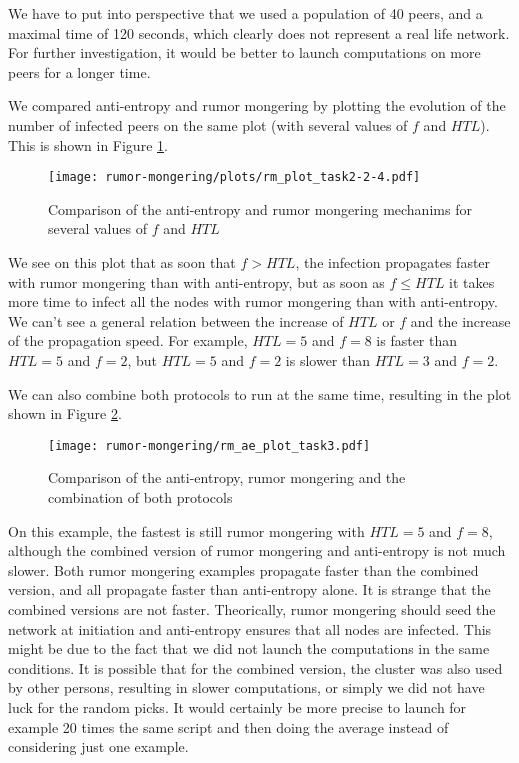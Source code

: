 \documentclass[a4paper, 11pt]{article}
\theoremstyle{plain}
\theoremstyle{definition}
\begin{document}
  We have to put into perspective that we used a population of 40 peers, and a maximal time of 120 seconds, which clearly does not represent a
  real life network. For further investigation, it would be better to launch computations on more peers for a
  longer time.

  We compared anti-entropy and rumor mongering by plotting the evolution of the number of infected peers on
  the same plot (with several values of $f$ and $HTL$). This is shown in Figure \ref{fig:task2-2-4}. 

  
  \begin{figure}[h]
    \centering
    \texttt{[image: rumor-mongering/plots/rm\_plot\_task2-2-4.pdf]}
    \caption{Comparison of the anti-entropy and rumor mongering mechanims for several values of $f$ and $HTL$}
    \label{fig:task2-2-4}
  \end{figure}

  We see on this plot that as soon that $f > HTL$, the infection propagates faster with rumor mongering than
  with anti-entropy, but as soon as $f \leq HTL$ it takes more time to infect all the nodes with rumor
  mongering than with anti-entropy. We can't see a general relation between the increase of $HTL$ or $f$ and
  the increase of the propagation speed. For example, $HTL=5$ and $f=8$ is faster than $HTL=5$ and $f=2$, but
  $HTL=5$ and $f = 2$ is slower than $HTL = 3$ and $f = 2$. 

  We can also combine both protocols to run at the same time, resulting in the plot shown in Figure \ref{figure:task2.3}.

  \begin{figure}[h]
    \centering 
    \texttt{[image: rumor-mongering/rm\_ae\_plot\_task3.pdf]}
    \caption{Comparison of the anti-entropy, rumor mongering and the combination of both protocols}
    \label{figure:task2.3}
  \end{figure}

  On this example, the fastest is still rumor mongering with $HTL = 5$ and $f = 8$, although the combined
  version of rumor mongering and anti-entropy is not much slower. Both rumor mongering examples propagate
  faster than the combined version, and all propagate faster than anti-entropy alone. It is strange that the
  combined versions are not faster. Theorically, rumor mongering should seed the network at initiation
  and anti-entropy ensures that all nodes are infected. This might be due to the fact that we did not launch
  the computations in the same conditions. It is possible that for the combined version, the cluster was also
  used by other persons, resulting in slower computations, or simply we did not have luck for the random
  picks. It would certainly be more precise to launch for example 20 times the same script and then doing the
  average instead of considering just one example.
    
\end{document}
